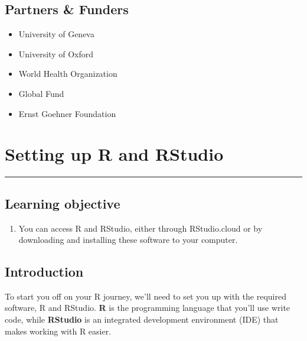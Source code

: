 \documentclass[
  letterpaper,
  DIV=11,
  numbers=noendperiod]{scrreprt}
\providecommand{\tightlist}{%
  \setlength{\itemsep}{0pt}\setlength{\parskip}{0pt}}\usepackage{longtable,booktabs,array}
\begin{document}
\hypertarget{partners-funders}{%
\section*{Partners \& Funders}\label{partners-funders}}


\begin{itemize}
\tightlist
\item
  University of Geneva
\item
  University of Oxford
\item
  World Health Organization
\item
  Global Fund
\item
  Ernst Goehner Foundation
\end{itemize}


\hypertarget{setting-up-r-and-rstudio}{%
\chapter{Setting up R and RStudio}\label{setting-up-r-and-rstudio}}

\begin{center}\rule{0.5\linewidth}{0.5pt}\end{center}

\hypertarget{learning-objective}{%
\section*{Learning objective}\label{learning-objective}}


\begin{enumerate}
\def\labelenumi{\arabic{enumi}.}
\tightlist
\item
  You can access R and RStudio, either through RStudio.cloud or by
  downloading and installing these software to your computer.
\end{enumerate}

\hypertarget{introduction-1}{%
\section{Introduction}\label{introduction-1}}

To start you off on your R journey, we'll need to set you up with the
required software, R and RStudio. \textbf{R} is the programming language
that you'll use write code, while \textbf{RStudio} is an integrated
development environment (IDE) that makes working with R easier.
\end{document}
